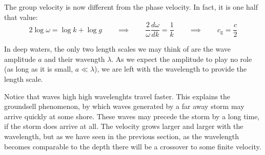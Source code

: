 The group velocity is now different from the phase velocity. In fact,
it is one half that value:
\[
2 \log\omega = \log k + \log g \qquad \implies \qquad
\frac{2}{\omega} \frac{d\omega}{dk} = \frac1{k} \qquad  \implies \qquad
c_\mathrm{g} = \frac{c}{2}
\]

In deep waters, the only two length scales we may think of are the
wave amplitude $a$ and their wavength $\lambda$. As we expect the
amplitude to play no role (as long as it is small, $a\ll\lambda$), we
are left with the wavelength to provide the length scale.

Notice that waves high high wavelenghts travel faster. This explains
the groundsell phenomenon, by which waves generated by a far away
storm may arrive quickly at some shore. These waves may precede the
storm by a long time, if the storm does arrive at all. The velocity
grows larger and larger with the wavelength, but as we have seen in
the previous section, as the wavelength becomes comparable to the
depth there will be a crossover to some finite velocity.


